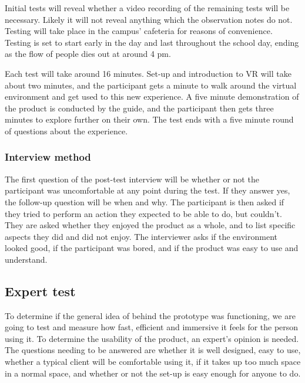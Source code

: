 Initial tests will reveal whether a video recording of the remaining tests will be necessary. Likely it will not reveal anything which the observation notes do not. Testing will take place in the campus' cafeteria for reasons of convenience. Testing is set to start early in the day and last throughout the school day, ending as the flow of people dies out at around 4 pm.

Each test will take around 16 minutes. Set-up and introduction to VR will take about two minutes, and the participant gets a minute to walk around the virtual environment and get used to this new experience. A five minute demonstration of the product is conducted by the guide, and the participant then gets three minutes to explore further on their own. The test ends with a five minute round of questions about the experience. 



\subsubsection{Interview method}
The first question of the post-test interview will be whether or not the participant was uncomfortable at any point during the test. If they answer yes, the follow-up question will be when and why.
The participant is then asked if they tried to perform an action they expected to be able to do, but couldn't. They are asked whether they enjoyed the product as a whole, and to list specific aspects they did and did not enjoy. The interviewer asks if the environment looked good, if the participant was bored, and if the product was easy to use and understand. 
\iffalse
\subsection{Expert test}
To determine if the general idea of behind the prototype was functioning, we are going to test and measure how fast, efficient and immersive it feels for the person using it.
To determine the usability of the product, an expert's opinion is needed. The questions needing to be answered are whether it is well designed, easy to use, whether a typical client will be comfortable using it, if it takes up too much space in a normal space, and whether or not the set-up is easy enough for anyone to do.
